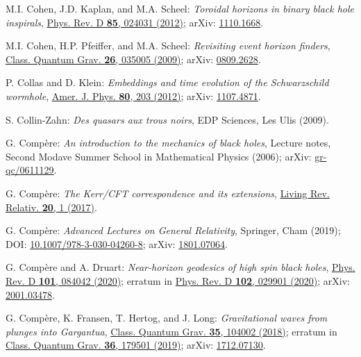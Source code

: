 \begin{thebibliography}{123}
M.I. Cohen, J.D. Kaplan, and M.A. Scheel:
{\em Toroidal horizons in binary black hole inspirals},
\href{https://doi.org/10.1103/PhysRevD.85.024031}{Phys. Rev. D {\bf 85}, 024031 (2012)};
arXiv: \href{https://arxiv.org/abs/1110.1668}{1110.1668}.

M.I. Cohen, H.P. Pfeiffer, and M.A. Scheel:
{\em Revisiting event horizon finders},
\href{https://doi.org/10.1088/0264-9381/26/3/035005}{Class. Quantum Grav. {\bf 26}, 035005 (2009)};
arXiv: \href{https://arxiv.org/abs/0809.2628}{0809.2628}.

P. Collas and D. Klein:
{\em Embeddings and time evolution of the Schwarzschild wormhole},
\href{https://doi.org/10.1119/1.3672848}{Amer. J. Phys. {\bf 80}, 203 (2012)};
arXiv: \href{https://arxiv.org/abs/1107.4871}{1107.4871}.

S. Collin-Zahn:
{\em Des quasars aux trous noirs},
EDP Sciences, Les Ulis (2009).

G. Compère:
{\em An introduction to the mechanics of black holes},
Lecture notes, Second Modave Summer School in Mathematical Physics (2006);
arXiv: \href{https://arxiv.org/abs/gr-qc/0611129}{gr-qc/0611129}.

G. Compère:
{\em The Kerr/CFT correspondence and its extensions},
\href{https://doi.org/10.1007/s41114-017-0003-2}{Living Rev. Relativ. {\bf 20}, 1 (2017)}.

G. Compère:
{\em Advanced Lectures on General Relativity},
Springer, Cham (2019);
DOI: \href{https://doi.org/10.1007/978-3-030-04260-8}{10.1007/978-3-030-04260-8};
arXiv: \href{https://arxiv.org/abs/1801.07064}{1801.07064}.

G. Compère and A. Druart:
{\em Near-horizon geodesics of high spin black holes},
\href{https://doi.org/10.1103/PhysRevD.101.084042}{Phys. Rev. D {\bf 101}, 084042 (2020)}; erratum in \href{https://doi.org/10.1103/PhysRevD.102.029901}{Phys. Rev. D {\bf 102}, 029901 (2020)};
arXiv: \href{https://arxiv.org/abs/2001.03478}{2001.03478}.

G. Compère, K. Fransen, T. Hertog, and J. Long:
{\em Gravitational waves from plunges into Gargantua},
\href{https://doi.org/10.1088/1361-6382/aab99e}{Class. Quantum Grav. {\bf 35}, 104002 (2018)};
erratum in \href{https://doi.org/10.1088/1361-6382/ab3629}{Class. Quantum Grav. {\bf 36}, 179501 (2019)};
arXiv: \href{https://arxiv.org/abs/1712.07130}{1712.07130}.


\end{thebibliography}
